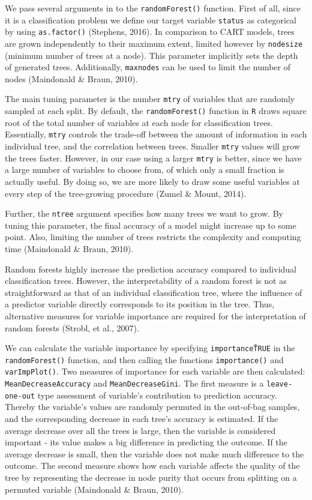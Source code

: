 \documentclass{article}
\begin{document}
We pass several arguments in to the \texttt{randomForest()} function. First of all, since it is a classification problem we define our target variable \texttt{status} as categorical by using \texttt{as.factor()} (Stephens, 2016). In comparison to CART models, trees are grown independently to their maximum extent, limited however by \texttt{nodesize} (minimum number of trees at a node). This parameter implicitly sets the depth of generated trees. Additionally, \texttt{maxnodes} can be used to limit the number of nodes (Maindonald \& Braun, 2010). 

The main tuning parameter is the number \texttt{mtry} of variables that are randomly sampled at each split. By default, the \texttt{randomForest()} function in \texttt{R} draws square root of the total number of variables at each node for classification trees. Essentially, \texttt{mtry} controls the trade-off between the amount of information in each individual tree, and the correlation between trees. Smaller \texttt{mtry} values will grow the trees faster. However, in our case using a larger \texttt{mtry} is better, since we have a large number of variables to choose from, of which only a small fraction is actually useful. By doing so, we are more likely to draw some useful variables at every step of the tree-growing procedure (Zumel \& Mount, 2014).

Further, the \texttt{ntree} argument specifies how many trees we want to grow. By tuning this parameter, the final accuracy of a model might increase up to some point. Also, limiting the number of trees restricts the complexity and computing time (Maindonald \& Braun, 2010). 

Random forests highly increase the prediction accuracy compared to individual classification trees. However, the interpretability of a random forest is not as straightforward as that of an individual classification tree, where the influence of a predictor variable directly corresponds to its position in the tree. Thus, alternative measures for variable importance are required for the interpretation of random forests (Strobl, et al., 2007). 

We can calculate the variable importance by specifying \texttt{importance\=TRUE} in the \texttt{randomForest()} function, and then calling the functions \texttt{importance()} and \texttt{varImpPlot()}. Two measures of importance for each variable are then calculated: \texttt{MeanDecreaseAccuracy} and \texttt{MeanDecreaseGini}. The first measure is a \texttt{leave-one-out} type assessment of variable's contribution to prediction accuracy. Thereby the variable's values are randomly permuted in the out-of-bag samples, and the corresponding decrease in each tree's accuracy is estimated. If the average decrease over all the trees is large, then the variable is considered important - its value makes a big difference in predicting the outcome. If the average decrease is small, then the variable does not make much difference to the outcome. The second measure shows how each variable affects the quality of the tree by representing the decrease in node purity that occurs from splitting on a permuted variable (Maindonald \& Braun, 2010). 
\end{document}
